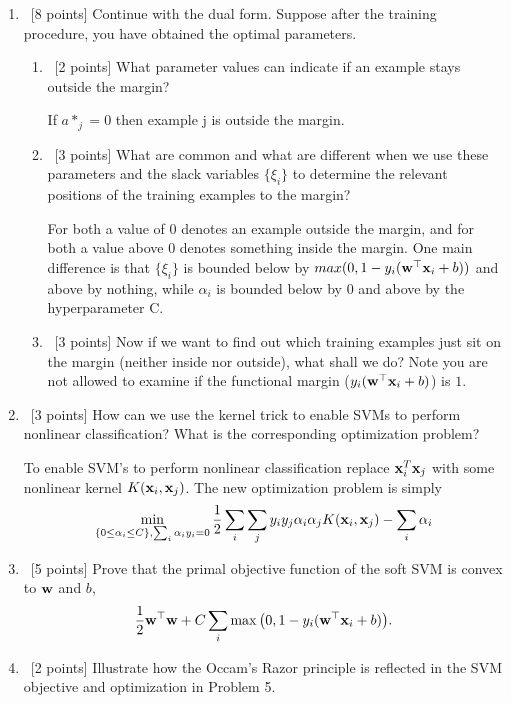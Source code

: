 \documentclass[12pt, fullpage,letterpaper]{article}
\begin{document}
\begin{enumerate}
	\item~[8 points] Continue with the dual form. Suppose after the training procedure, you have obtained the optimal parameters.
	\begin{enumerate}
		\item~[2 points] What parameter values can indicate if an example stays outside the margin?
		
		If $a*_j = 0$ then example j is outside the margin.
		
		\item~[3 points] What are common and what are different when we use these parameters and the slack variables $\{\xi_i\}$ to determine the relevant positions of the training examples to the margin?
		
		For both a value of 0 denotes an example outside the margin, and for both a value above 0 denotes something inside the margin. One main difference is that $\{\xi_i\}$ is bounded below by $max(0, 1 - y_i({\bf w}^\top {\bf x}_i + b))$ and above by nothing, while $\alpha_i$ is bounded below by 0 and above by the hyperparameter C.
		
		\item~[3 points] Now if we want to find out which training examples just sit on the margin (neither inside nor outside), what shall we do? Note you are not allowed to examine if the functional margin (\ie $y_i({\bf w}^\top{\bf x}_i +b)$) is $1$.
	\end{enumerate}
	
	
	\item~[3 points] How can we use the kernel trick to enable SVMs to perform nonlinear classification? What is the corresponding optimization problem?
	
	To enable SVM's to perform nonlinear classification replace ${\bf x}_i^T{\bf x}_j$ with some nonlinear kernel $K({\bf x}_i, {\bf x}_j)$. The new optimization problem is simply \[
	\min\limits_{\{0 \le \alpha_i \le C\}, \sum_i \alpha_i y_i = 0} \frac{1}{2} \sum_i \sum_j y_i y_j \alpha_i \alpha_j K({\bf x}_i, {\bf x}_j) - \sum_{i} \alpha_i
	\]


	\item~[5 points] Prove that the primal objective function of the soft SVM is convex to ${\bf w}$ and $b$, 
	\[
	\frac{1}{2}{\bf w}^\top{\bf w} + C\sum_{i} \max\big(0, 1 - y_i({\bf w}^\top{\bf x}_i+b)\big).
	\]
	
	\item~[2 points] Illustrate how the Occam's Razor principle is reflected in the SVM objective and optimization in Problem 5. 
	

\end{enumerate}
\end{document}
